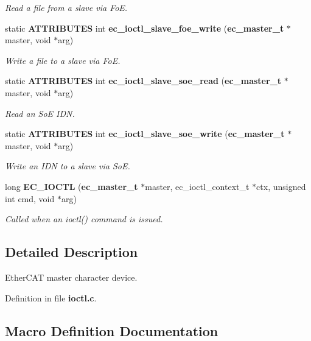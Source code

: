 \begin{DoxyCompactItemize}
\begin{DoxyCompactList}\small\item\em Read a file from a slave via Fo\-E. \end{DoxyCompactList}\item 
static {\bf A\-T\-T\-R\-I\-B\-U\-T\-E\-S} int {\bf ec\-\_\-ioctl\-\_\-slave\-\_\-foe\-\_\-write} ({\bf ec\-\_\-master\-\_\-t} $\ast$master, void $\ast$arg)
\begin{DoxyCompactList}\small\item\em Write a file to a slave via Fo\-E. \end{DoxyCompactList}\item 
static {\bf A\-T\-T\-R\-I\-B\-U\-T\-E\-S} int {\bf ec\-\_\-ioctl\-\_\-slave\-\_\-soe\-\_\-read} ({\bf ec\-\_\-master\-\_\-t} $\ast$master, void $\ast$arg)
\begin{DoxyCompactList}\small\item\em Read an So\-E I\-D\-N. \end{DoxyCompactList}\item 
static {\bf A\-T\-T\-R\-I\-B\-U\-T\-E\-S} int {\bf ec\-\_\-ioctl\-\_\-slave\-\_\-soe\-\_\-write} ({\bf ec\-\_\-master\-\_\-t} $\ast$master, void $\ast$arg)
\begin{DoxyCompactList}\small\item\em Write an I\-D\-N to a slave via So\-E. \end{DoxyCompactList}\item 
long {\bf E\-C\-\_\-\-I\-O\-C\-T\-L} ({\bf ec\-\_\-master\-\_\-t} $\ast$master, ec\-\_\-ioctl\-\_\-context\-\_\-t $\ast$ctx, unsigned int cmd, void $\ast$arg)
\begin{DoxyCompactList}\small\item\em Called when an ioctl() command is issued. \end{DoxyCompactList}\end{DoxyCompactItemize}


\subsection{Detailed Description}
Ether\-C\-A\-T master character device. 

Definition in file {\bf ioctl.\-c}.



\subsection{Macro Definition Documentation}
